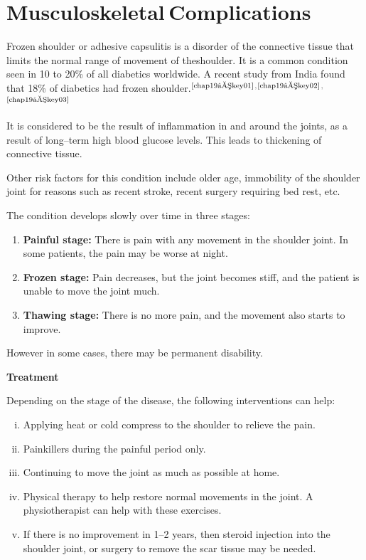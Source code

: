 \chapter{Musculoskeletal Complications}\label{chap19}

\vspace{-\topsep}

Frozen shoulder or adhesive capsulitis is a disorder of the conne\-ctive tissue that limits the normal range of movement of the\break shoulder. It is a common condition seen in 10 to 20\% of all diabetics worldwide. A recent study from India found that 18\% of diabetics had frozen shoulder.$^{\text{\cite{chap19–key01}}}$$^,$$^{\text{\cite{chap19–key02}}}$$^,$$^{\text{\cite{chap19–key03}}}$

It is considered to be the result of inflammation in and around the joints, as a result of long–term high blood glucose levels. This leads to thicke\-ning of connective tissue.

Other risk factors for this condition include older age, immobility of the shoulder joint for reasons such as recent stroke, recent surgery requiring bed rest, etc.

\noindent The condition develops slowly over time in three stages:

\vspace{-\topsep}
\begin{enumerate}
\itemsep=0pt
\item \textbf{Painful stage:} There is pain with any movement in the shoulder joint. In some patients, the pain may be worse at night.
\item \textbf{Frozen stage:} Pain decreases, but the joint becomes stiff, and the patient is unable to move the joint much.
\item \textbf{Thawing stage:} There is no more pain, and the movement also starts to improve.
\end{enumerate}
\vspace{-\topsep}

\noindent However in some cases, there may be permanent disability.

\noindent\textbf{Treatment}

\noindent Depending on the stage of the disease, the following interventions can help:

\begin{enumerate}[i.]
\itemsep=0pt
\item Applying heat or cold compress to the shoulder to relieve the pain.
\item Painkillers during the painful period only.
\item Continuing to move the joint as much as possible at home.
\item Physical therapy to help restore normal movements in the joint. A physiotherapist can help with these exercises.
\item If there is no improvement in 1–2 years, then steroid injection into the shoulder joint, or surgery to remove the scar tissue may be needed.
\end{enumerate}
\vspace{-\topsep}


